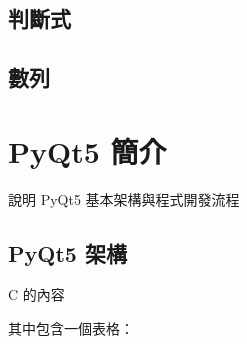 \documentclass[12pt,,]{report}
\begin{document}
\hypertarget{ux5224ux65b7ux5f0f}{%
\section{判斷式}\label{ux5224ux65b7ux5f0f}}

\hypertarget{ux6578ux5217}{%
\section{數列}\label{ux6578ux5217}}

\hypertarget{pyqt5-ux7c21ux4ecb}{%
\chapter{PyQt5 簡介}\label{pyqt5-ux7c21ux4ecb}}

說明 PyQt5 基本架構與程式開發流程

\hypertarget{pyqt5-ux67b6ux69cb}{%
\section{PyQt5 架構}\label{pyqt5-ux67b6ux69cb}}

C 的內容

其中包含一個表格：
\end{document}
